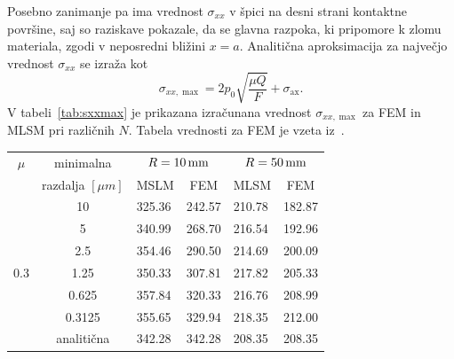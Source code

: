 \documentclass[12pt,a4paper,twoside]{article}
\theoremstyle{definition} %
\theoremstyle{plain} %
\numberwithin{equation}{section}
\newcommand{\ts}{\sigma}
\newcommand{\sax}{\ensuremath{\sigma_{\text{ax}}}}
\begin{document}
Posebno zanimanje pa ima vrednost $\ts_{xx}$ v špici na desni strani kontaktne površine,
saj so raziskave pokazale, da se glavna razpoka, ki pripomore k zlomu materiala, zgodi v neposredni
bližini $x = a$. Analitična aproksimacija za največjo vrednost $\ts_{xx}$ se izraža
kot~\cite[enačba (7), str.\ 6]{pereira2016convergence}
\begin{equation}
  \ts_{xx, \max} = 2 p_0 \sqrt{\frac{\mu Q}{F}} + \sax.
\end{equation}
V tabeli~\ref{tab:sxxmax} je prikazana izračunana vrednost $\ts_{xx, \max}$ za FEM in MLSM
pri različnih $N$. Tabela vrednosti za FEM je vzeta iz~\cite[tabela 3]{pereira2016convergence}.
\begin{table}[h]
  \centering
  \begin{tabular}{ccllll} \hline
    \multicolumn{1}{c}{$\mu$} & minimalna        & \multicolumn{2}{c}{$R=\unit[10]{mm}$}              & \multicolumn{2}{c}{$R=\unit[50]{mm}$}              \\ \cline{3-6}
    & razdalja $[\unit{\mu m}]$ & \multicolumn{1}{c}{MSLM} & \multicolumn{1}{c}{FEM} & \multicolumn{1}{c}{MLSM} & \multicolumn{1}{c}{FEM} \\ \hline \hline
                              & 10                 & 325.36                   & 242.57                  & 210.78                   & 182.87                  \\
                              & 5                  & 340.99                   & 268.70                  & 216.54                   & 192.96                  \\
                              & 2.5                & 354.46                   & 290.50                  & 214.69                   & 200.09                  \\
    0.3                       & 1.25               & 350.33                   & 307.81                  & 217.82                   & 205.33                  \\
                              & 0.625              & 357.84                   & 320.33                  & 216.76                   & 208.99                  \\
                              & 0.3125             & 355.65                   & 329.94                  & 218.35                   & 212.00                  \\ \cline{2-6}
                              & analitična         & 342.28                   & 342.28                  & 208.35                   & 208.35                  \\ \hline

\end{tabular}
\end{table}
\end{document}
